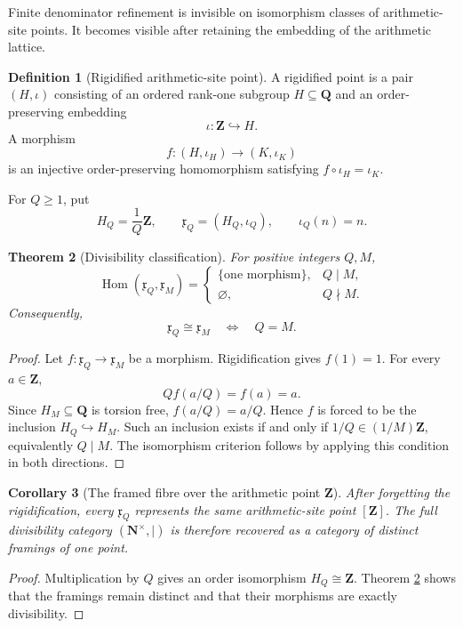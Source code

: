 \documentclass[11pt]{amsart}
\numberwithin{equation}{section}
\newtheorem{theorem}{Theorem}[section]
\newtheorem{corollary}[theorem]{Corollary}
\theoremstyle{definition}
\newtheorem{definition}[theorem]{Definition}
\newcommand{\Z}{\mathbf Z}
\newcommand{\Q}{\mathbf Q}
\newcommand{\N}{\mathbf N}
\begin{document}
Finite denominator refinement is invisible on isomorphism classes of
arithmetic-site points.  It becomes visible after retaining the embedding
of the arithmetic lattice.

\begin{definition}[Rigidified arithmetic-site point]
\label{def:rigidified-point}
A rigidified point is a pair $(H,\iota)$ consisting of an ordered rank-one
subgroup $H\subseteq\Q$ and an order-preserving embedding
\[
\iota:\Z\hookrightarrow H.
\]
A morphism
\[
f:(H,\iota_H)\longrightarrow(K,\iota_K)
\]
is an injective order-preserving homomorphism satisfying
$f\circ\iota_H=\iota_K$.

For $Q\geq1$, put
\[
H_Q=\frac1Q\Z,
\qquad
\mathfrak x_Q=(H_Q,\iota_Q),
\qquad
\iota_Q(n)=n.
\]
\end{definition}

\begin{theorem}[Divisibility classification]
\label{thm:rigidified-divisibility}
For positive integers $Q,M$,
\[
\operatorname{Hom}(\mathfrak x_Q,\mathfrak x_M)
=
\begin{cases}
\{\text{one morphism}\},&Q\mid M,\\
\varnothing,&Q\nmid M.
\end{cases}
\]
Consequently,
\[
\mathfrak x_Q\cong\mathfrak x_M
\quad\Longleftrightarrow\quad
Q=M.
\]
\end{theorem}

\begin{proof}
Let $f:\mathfrak x_Q\to\mathfrak x_M$ be a morphism.  Rigidification gives
$f(1)=1$.  For every $a\in\Z$,
\[
Qf(a/Q)=f(a)=a.
\]
Since $H_M\subseteq\Q$ is torsion free, $f(a/Q)=a/Q$.  Hence $f$ is forced
to be the inclusion $H_Q\hookrightarrow H_M$.  Such an inclusion exists
if and only if $1/Q\in(1/M)\Z$, equivalently $Q\mid M$.  The isomorphism
criterion follows by applying this condition in both directions.
\end{proof}

\begin{corollary}[The framed fibre over the arithmetic point $\Z$]
\label{cor:framed-fibre}
After forgetting the rigidification, every $\mathfrak x_Q$ represents the
same arithmetic-site point $[\Z]$.  The full divisibility category
$(\N^\times,\mid)$ is therefore recovered as a category of distinct
framings of one point.
\end{corollary}

\begin{proof}
Multiplication by $Q$ gives an order isomorphism
$H_Q\cong\Z$.  Theorem \ref{thm:rigidified-divisibility} shows that the
framings remain distinct and that their morphisms are exactly divisibility.
\end{proof}
\end{document}
